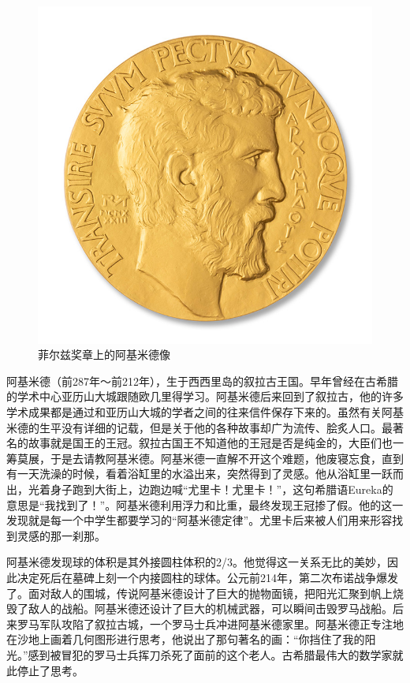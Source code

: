 \documentclass[b5paper]{ctexart}
\begin{document}
\begin{figure}[htbp]
 \centering
 \includegraphics[scale=0.33]{img/FieldsMedal}
 \caption{菲尔兹奖章上的阿基米德像}
 \label{fig:Archimedes-book}
\end{figure}

\begin{mdframed}
阿基米德（前287年～前212年），生于西西里岛的叙拉古王国。早年曾经在古希腊的学术中心亚历山大城跟随欧几里得学习。阿基米德后来回到了叙拉古，他的许多学术成果都是通过和亚历山大城的学者之间的往来信件保存下来的。虽然有关阿基米德的生平没有详细的记载，但是关于他的各种故事却广为流传、脍炙人口。最著名的故事就是国王的王冠。叙拉古国王不知道他的王冠是否是纯金的，大臣们也一筹莫展，于是去请教阿基米德。阿基米德一直解不开这个难题，他废寝忘食，直到有一天洗澡的时候，看着浴缸里的水溢出来，突然得到了灵感。他从浴缸里一跃而出，光着身子跑到大街上，边跑边喊“尤里卡！尤里卡！”，这句希腊语Eureka的意思是“我找到了！”。阿基米德利用浮力和比重，最终发现王冠掺了假。他的这一发现就是每一个中学生都要学习的“阿基米德定律”。尤里卡后来被人们用来形容找到灵感的那一刹那。

阿基米德发现球的体积是其外接圆柱体积的2/3。他觉得这一关系无比的美妙，因此决定死后在墓碑上刻一个内接圆柱的球体。公元前214年，第二次布诺战争爆发了。面对敌人的围城，传说阿基米德设计了巨大的抛物面镜，把阳光汇聚到帆上烧毁了敌人的战船。阿基米德还设计了巨大的机械武器，可以瞬间击毁罗马战船。后来罗马军队攻陷了叙拉古城，一个罗马士兵冲进阿基米德家里。阿基米德正专注地在沙地上画着几何图形进行思考，他说出了那句著名的画：“你挡住了我的阳光。”感到被冒犯的罗马士兵挥刀杀死了面前的这个老人。古希腊最伟大的数学家就此停止了思考。
\end{mdframed}
\end{document}
